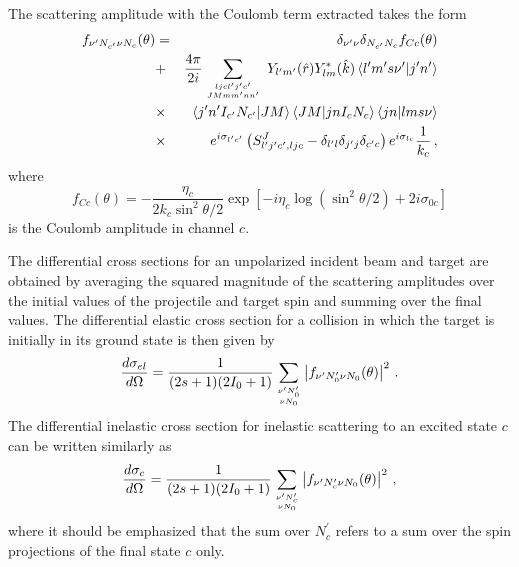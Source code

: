 \documentclass[twocolumn,amsmath,amssymb,10pt,groupedaddress,a4paper]{revtex4}
\begin{document}
The scattering amplitude with the Coulomb term extracted takes
the form \begin{eqnarray}
f_{\nu^{\prime}N_{c^{\prime}}\nu N_{c}}(\theta) & = & \delta_{\nu^{\prime}\nu}\delta_{N_{c^{\prime}}N_{c}}f_{Cc}(\theta) \\
 & + & \frac{4\pi}{2i}\sum_{{{ljcl^{\prime}j^{\prime}c^{\prime}\atop
      JMmm^{\prime}nn^{\prime}}}}\;
Y_{l^{\prime}m^{\prime}}(\hat{r})Y_{lm}^{*}(\hat{k})\left\langle
l^{\prime}m^{\prime}s\nu^{\prime}|j^{\prime}n^{\prime}\right\rangle \nonumber\\
& \times &\left\langle
j^{\prime}n^{\prime}I_{c^{\prime}}N_{c^{\prime}}|JM\right\rangle
\left\langle JM|jnI_{c}N_{c}\right\rangle \left\langle
jn|lms\nu\right\rangle \nonumber \\
&\times & e^{i\sigma_{l^{\prime}c^{\prime}}}\left(S_{l^{\prime}j^{\prime}c^{\prime},ljc}^{J}-\delta_{l^{\prime}l}\delta_{j^{\prime}j}\delta_{c^{\prime}c}\right)e^{i\sigma_{lc}}\frac{1}{k_{c}}\,,\nonumber \end{eqnarray}
 where \begin{equation}
f_{Cc}(\theta)=-\frac{\eta_{c}}{2k_{c}\sin^{2}\theta/2}\exp\left[-i\eta_{c}\log\left(\sin^{2}\theta/2\right)+2i\sigma_{0c}\right]\end{equation}
 is the Coulomb amplitude in channel $c$.

The differential cross sections for an unpolarized incident beam and
target are obtained by averaging the squared magnitude of the scattering
amplitudes over the initial values of the projectile and target spin
and summing over the final values. The differential elastic cross
section for a collision in which the target is initially in its ground
state is then given by \begin{equation}
\frac{d\sigma_{el}}{d\Omega}=\frac{1}{(2s+1)(2I_{0}+1)}\sum_{{{\nu^{\prime}N_{0}^{\prime}\atop \nu N_{0}}}}\left|f_{\nu^{\prime}N_{0}^{\prime}\nu N_{0}}(\theta)\right|^{2}\,.\label{celf}\end{equation}
 The differential inelastic cross section for inelastic scattering
to an excited state $c$ can be written similarly as \begin{equation}
\frac{d\sigma_{c}}{d\Omega}=\frac{1}{(2s+1)(2I_{0}+1)}\sum_{{{\nu^{\prime}N_{c}^{\prime}\atop \nu N_{0}}}}\left|f_{\nu^{\prime}N_{c}^{\prime}\nu N_{0}}(\theta)\right|^{2}\,,\end{equation}
 where it should be emphasized that the sum over $N_{c}^{\prime}$
refers to a sum over the spin projections of the final state $c$
only.
\end{document}
